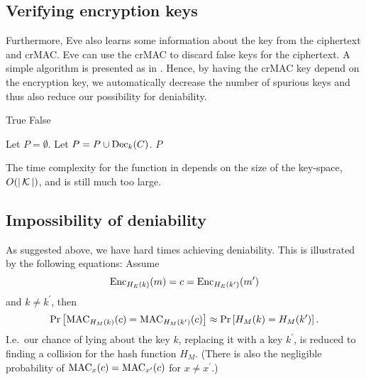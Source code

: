 \subsection{Verifying encryption keys}

Furthermore, Eve also learns some information about the key from the ciphertext 
and \ac{crMAC}.
Eve can use the \ac{crMAC} to discard false keys for the ciphertext.
A simple algorithm is presented as  in 
.
Hence, by having the \ac{crMAC} key depend on the encryption key, we 
automatically decrease the number of spurious keys and thus also reduce our 
possibility for deniability.

\begin{algorithm}
  \caption{%
    Algorithm for finding possible plaintexts and discarding false keys.
  }
  \label{alg:falsekeys}
  \hrulefill
  \begin{algorithmic}
        \State \Return True
      \EndIf
      \State \Return False
    \EndFunction

    \Statex
      \State Let $P = \emptyset$.
          \State Let $P = P\cup \operatorname{\mathrm{Dec}}_k( C )$.
        \EndIf
      \EndFor
      \State \Return $P$
    \EndFunction
  \end{algorithmic}
  \hrulefill
\end{algorithm}

The time complexity for the function  in  
depends on the size of the key-space, \(O(|\operatorname{\mathcal K}|)\), and is still much too 
large.

\subsection{Impossibility of deniability}

As suggested above, we have hard times achieving deniability.
This is illustrated by the following equations:
Assume
\begin{equation*}
  \operatorname{\mathrm{Enc}}_{H_E(k)}( m ) = c = \operatorname{\mathrm{Enc}}_{H_E(k^\prime)}( m^\prime )
\end{equation*}
and \(k\neq k^\prime\), then
\begin{equation*}
  \Pr\left[
    \operatorname{\mathrm{MAC}}_{H_M(k)}( c ) = \operatorname{\mathrm{MAC}}_{H_M(k^\prime)}( c )
  \right]
  \approx
  \Pr\left[ H_M(k) = H_M(k^\prime) \right].
\end{equation*}
I.e.~our chance of lying about the key \(k\), replacing it with a key 
\(k^\prime\), is reduced to finding a collision for the hash function \(H_M\).
(There is also the negligible probability of \(\operatorname{\mathrm{MAC}}_x(c) = \operatorname{\mathrm{MAC}}_{x^\prime}(c)\) 
for \(x\neq x^\prime\).)

